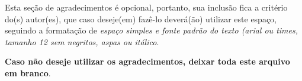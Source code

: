 \begin{agradecimentos}
Esta seção de agradecimentos é opcional, portanto, sua inclusão 
fica a critério do(s) autor(es), que caso deseje(em) fazê-lo deverá(ão) 
utilizar este espaço, seguindo a formatação de \textit{espaço simples e 
fonte padrão do texto (arial ou times, tamanho 12 sem negritos, aspas ou 
itálico}.

\textbf{Caso não deseje utilizar os agradecimentos, deixar toda este arquivo
em branco}.
\end{agradecimentos}
